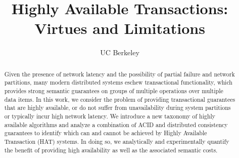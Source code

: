 \documentclass{vldb}
\begin{document}

\title{Highly Available Transactions: Virtues and Limitations}
\author{UC Berkeley}\vspace{-2em}
\maketitle

\begin{abstract}
Given the presence of network latency and the possibility of partial
failure and network partitions, many modern distributed systems eschew
transactional functionality, which provides strong semantic guarantees
on groups of multiple operations over multiple data items. In this
work, we consider the problem of providing transactional guarantees
that are highly available, or do not suffer from unavailability during
system partitions or typically incur high network latency.  We
introduce a new taxonomy of highly available algorithms and analyze a
combination of ACID and distributed consistency guarantees to identify
which can and cannot be achieved by Highly Available Transaction (HAT)
systems. In doing so, we analytically and experimentally quantify the
benefit of providing high availability as well as the associated
semantic costs.
\end{abstract}



















\footnotesize
  



\end{document}
